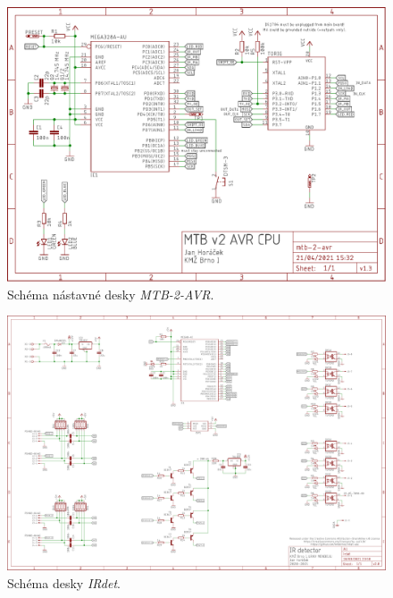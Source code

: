 \begin{figure}[ht]
\includegraphics[angle=90,width=\textwidth]{data/mtb-2-avr-ele.pdf}
\caption{Schéma nástavné desky \textit{MTB-2-AVR}.}
\label{fig:mtb-uni-2-avr-sch}
\end{figure}

\begin{figure}[ht]
\includegraphics[angle=90,width=\textwidth]{data/irdet-ele.pdf}
\caption{Schéma desky \textit{IRdet}.}
\label{fig:irdet-sch}
\end{figure}
